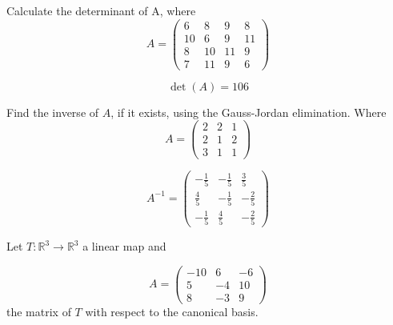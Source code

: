 \begin{questions}

\question Calculate the determinant of A, where
$$
A=\left(\begin{array}{rrrr}
6 & 8 & 9 & 8 \\
10 & 6 & 9 & 11 \\
8 & 10 & 11 & 9 \\
7 & 11 & 9 & 6
\end{array}\right)
$$

\begin{solution}
$$\det(A)=106$$
\end{solution}

\question Find the inverse of $A$, if it exists, using the Gauss-Jordan elimination. Where
$$
A=\left(\begin{array}{rrr}
2 & 2 & 1 \\
2 & 1 & 2 \\
3 & 1 & 1
\end{array}\right)
$$

\begin{solution}
$$A^{-1}=\left(\begin{array}{rrr}
-\frac{1}{5} & -\frac{1}{5} & \frac{3}{5} \\
\frac{4}{5} & -\frac{1}{5} & -\frac{2}{5} \\
-\frac{1}{5} & \frac{4}{5} & -\frac{2}{5}
\end{array}\right)$$
\end{solution}

\question Let $T:\mathbb{R}^3\rightarrow\mathbb{R}^3$  a linear map and
 
$$
A=\left(\begin{array}{rrr}
-10 & 6 & -6 \\
5 & -4 & 10 \\
8 & -3 & 9
\end{array}\right)
$$
the matrix of $T$ with respect to the canonical basis.
\end{questions}
